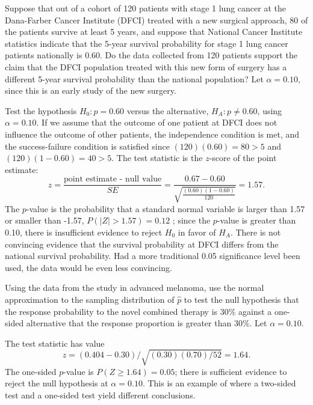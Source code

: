 \begin{examplewrap}
\begin{nexample}{Suppose that out of a cohort of 120 patients with stage 1 lung cancer at the Dana-Farber Cancer Institute (DFCI) treated with a new surgical approach, 80 of the patients survive at least 5 years, and suppose that National Cancer Institute statistics indicate that the 5-year survival probability for stage 1 lung cancer patients nationally is 0.60. Do the data collected from 120 patients support the claim that the DFCI population treated with this new form of surgery has a different 5-year survival probability than the national population? Let $\alpha = 0.10$, since this is an early study of the new surgery.}

Test the hypothesis $H_0: p = 0.60$ versus the alternative, $H_A:  p \neq 0.60$, using $\alpha = 0.10$. If we assume that the outcome of one patient at DFCI does not influence the outcome of other patients, the independence condition is met, and the success-failure condition is satisfied since $(120)(0.60) = 80 > 5$ and $(120)(1-0.60) = 40 > 5.$ The test statistic is the $z$-score of the point estimate:
\[z = \dfrac{\text{point estimate - null value}}{SE} = \dfrac{0.67 - 0.60}{\sqrt{\frac{(0.60)(1-0.60)}{120}}} = 1.57. \]
The $p$-value is the probability that a standard normal variable is larger than 1.57 or smaller than -1.57, $P(|Z| > 1.57) = 0.12$ ; since the $p$-value is greater than 0.10, there is insufficient evidence to reject $H_0$ in favor of $H_A$. There is not convincing evidence that the survival probability at DFCI differs from the national survival probability.  Had a more traditional 0.05 significance level been used, the data would be even less convincing.
\end{nexample}
\end{examplewrap}

\begin{examplewrap}
\begin{nexample}{Using the data from the study in advanced melanoma, use the normal approximation to the sampling distribution of $\hat{p}$ to test the null hypothesis that the response probability to the novel combined therapy is 30\% against a one-sided alternative that the response proportion is greater than 30\%. Let $\alpha = 0.10$.}

The test statistic has value
\[
z = (0.404 - 0.30)/\sqrt{(0.30)(0.70)/52} = 1.64.
\]
The one-sided $p$-value is $P(Z \geq 1.64) = 0.05$; there is sufficient evidence to reject the null hypothesis at $\alpha = 0.10$. This is an example of where a two-sided test and a one-sided test yield different conclusions.
\end{nexample}
\end{examplewrap}

